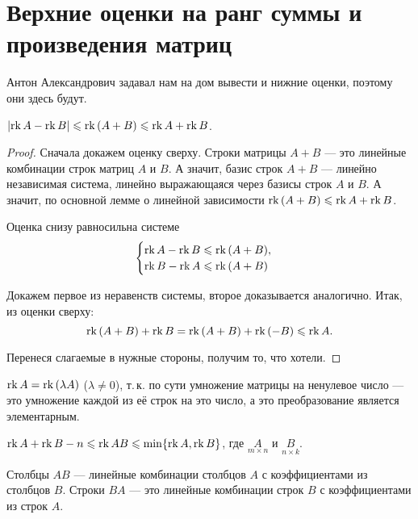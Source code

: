 \section{Верхние оценки на ранг суммы и произведения матриц}

Антон Александрович задавал нам на дом вывести и нижние оценки, поэтому они здесь будут.

\begin{statement}
    $|\mathrm{rk}\, A - \mathrm{rk}\, B| \leqslant \mathrm{rk}\,(A + B) \leqslant \mathrm{rk}\, A + \mathrm{rk}\, B$.
\end{statement}

\begin{proof}
    Сначала докажем оценку сверху. Строки матрицы $A + B$ --- это линейные комбинации строк матриц $A$ и $B$. А значит, базис строк $A + B$ --- линейно независимая система, линейно выражающаяся через базисы строк $A$ и $B$. А значит, по основной лемме о линейной зависимости $\mathrm{rk}\,(A + B) \leqslant \mathrm{rk}\, A + \mathrm{rk}\, B$.

    Оценка снизу равносильна системе
    $$
    \begin{cases}
        \mathrm{rk}\, A - \mathrm{rk}\, B \leqslant \mathrm{rk}\,(A + B),\\
        \mathrm{rk}\, B - \mathrm{rk}\, A \leqslant \mathrm{rk}\,(A + B)
    \end{cases}
    $$

    Докажем первое из неравенств системы, второе доказывается аналогично. Итак, из оценки сверху:
    $$
    \mathrm{rk}\,(A + B) + \mathrm{rk}\, B = \mathrm{rk}\,(A + B) + \mathrm{rk}\,(-B) \leqslant \mathrm{rk}\, A.
    $$

    Перенеся слагаемые в нужные стороны, получим то, что хотели.
\end{proof}

\begin{remark}
    $\mathrm{rk}\, A = \mathrm{rk}\, (\lambda A)$ ($\lambda \ne 0$), т.\,к. по сути умножение матрицы на ненулевое число --- это умножение каждой из её строк на это число, а это преобразование является элементарным.
\end{remark}

\begin{statement}
    $\mathrm{rk}\, A + \mathrm{rk}\, B - n \leqslant \mathrm{rk}\, AB \leqslant \min\{\mathrm{rk}\, A, \mathrm{rk}\, B\}$, где $\underset{m \times n}{A}$ и $\underset{n \times k}{B}$.
\end{statement}

\begin{lemma}
    Столбцы $AB$ --- линейные комбинации столбцов $A$ с коэффициентами из столбцов $B$. Строки $BA$ --- это линейные комбинации строк $B$ с коэффициентами из строк $A$.
\end{lemma}

